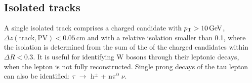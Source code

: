 %


\subsection{Isolated tracks}
\label{sec:SIT}

A single isolated track comprises a charged \PF candidate with ${p_{\text T}} >
10 \mathrm{\,Ge\kern -0.1em V}$,\\ $\Delta z(\mathrm{track}, \mathrm{PV}) < 0.05 \,
\mathrm{cm}$ and with a relative isolation smaller than 0.1, where the
isolation is determined from the sum of the \Pt of the charged \PF
candidates within $\Delta R < 0.3$. It is useful for identifying W
bosons through their leptonic decays, when the lepton is not fully
reconstructed. Single prong decays of
the tau lepton can also be identified: $\tau$
$\rightarrow$ h$^{\pm}$ + n$\pi^{0}$ $\nu$. 

